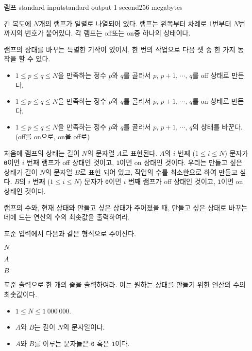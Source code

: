 \begin{problem}{램프}
	{standard input}{standard output}
	{1 second}{256 megabytes}{}
	
	긴 복도에 $N$개의 램프가 일렬로 나열되어 있다. 램프는 왼쪽부터 차례로 1번부터 $N$번까지의 번호가 붙어있다. 각 램프는 off또는 on중 하나의 상태이다.
	
	램프의 상태를 바꾸는 특별한 기작이 있어서, 한 번의 작업으로 다음 셋 중 한 가지 동작을 할 수 있다.
	
	\begin{itemize}
		\item $1 \le p \le q \le N$을 만족하는 정수 $p$와 $q$를 골라서 $p$, $p+1$, $\cdots$, $q$를 off 상태로 만든다.
		\item $1 \le p \le q \le N$을 만족하는 정수 $p$와 $q$를 골라서 $p$, $p+1$, $\cdots$, $q$를 on 상태로 만든다.
		\item $1 \le p \le q \le N$을 만족하는 정수 $p$와 $q$를 골라서 $p$, $p+1$, $\cdots$, $q$의 상태를 바꾼다. (off를 on으로, on을 off로)
	\end{itemize} 

	처음에 램프의 상태는 길이 $N$의 문자열 $A$로 표현된다. $A$의 $i$ 번째 ($1 \le i \le N$) 문자가 \texttt{0}이면 $i$ 번째 램프가 off 상태인 것이고, \texttt{1}이면 on 상태인 것이다. 우리는 만들고 싶은 상태가 길이 $N$의 문자열 $B$로 표현 되어 있고, 작업의 수를 최소한으로 하여 만들고 싶다. $B$의 $i$ 번째 ($1 \le i \le N$) 문자가 \texttt{0}이면 $i$ 번째 램프가 off 상태인 것이고, \texttt{1}이면 on 상태인 것이다. 
	
	램프의 수와, 현재 상태와 만들고 싶은 상태가 주어졌을 때, 만들고 싶은 상태로 바꾸는 데에 드는 연산의 수의 최솟값을 출력하여라.

	\InputFile
	
	표준 입력에서 다음과 같은 형식으로 주어진다.
	
	$N$

	$A$

	$B$
	
	
	\OutputFile
	
	표준 출력으로 한 개의 줄을 출력하여라. 이는 원하는 상태를 만들기 위한 연산의 수의 최솟값이다.
		
	\Constraints
	
	\begin{itemize}
		\item $1 \le N \le 1\ 000\ 000$.
		\item $A$와 $B$는 길이 $N$의 문자열이다.
		\item $A$와 $B$를 이루는 문자들은 \texttt{0} 혹은 \texttt{1}이다.
	\end{itemize}
	

\end{problem}
